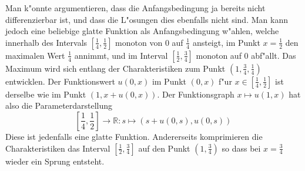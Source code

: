Man k"onnte argumentieren, dass die Anfangsbedingung ja bereits nicht differenzierbar
ist, und dass die L"osungen dies ebenfalls nicht sind. Man kann
jedoch eine beliebige glatte Funktion als Anfangsbedingung w"ahlen, welche
innerhalb des Intervals $[\frac14,\frac12]$ monoton von $0$ auf $\frac14$ 
ansteigt, im Punkt $x=\frac12$ den maximalen Wert $\frac14$ annimmt,
und im Interval $[\frac12,\frac34]$ monoton auf $0$ abf"allt.
Das Maximum wird sich entlang der Charakteristiken zum Punkt
$(1,\frac34,\frac14)$ entwicklen. Der Funktionswert $u(0,x)$ im Punkt $(0,x)$
f"ur $x\in[\frac14,\frac12]$ ist derselbe wie im Punkt $(1,x+u(0,x))$.
Der Funktionsgraph $x\mapsto u(1,x)$ hat also die Parameterdarstellung
\[
[{\textstyle\frac14},{\textstyle\frac12}]\to\mathbb R\colon s\mapsto (s+u(0,s),u(0,s))
\]
Diese ist jedenfalls eine glatte Funktion. Andererseits komprimieren
die Charakteristiken das Interval $[\frac12,\frac34]$ auf
den Punkt $(1,\frac34)$ so dass bei $x=\frac34$ wieder ein Sprung entsteht.

